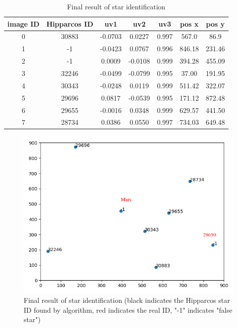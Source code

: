\documentclass[12pt,a4paper,twoside]{article}
\begin{document}
\renewcommand{\arraystretch}{1.5}
\begin{table}[!htbp]
\centering
\begin{tabular}{|c|c|c|c|c|c|c|}
\hline 
image ID & Hipparcos ID & uv1 & uv2 & uv3 & pos x & pos y \\ 
\hline 
0 &  30883 & -0.0703 &  0.0227 & 0.997 &  567.0 &  86.9 \\
\hline 
1 & -1 & -0.0423 &  0.0767 & 0.996 &  846.18 &  231.46 \\
\hline 
2 & -1 &  0.0009 & -0.0108 & 0.999 &  394.28 &  455.09 \\
\hline 
3 &  32246 & -0.0499 & -0.0799 & 0.995 &  37.00 &  191.95 \\
\hline 
4 &  30343 & -0.0248 &  0.0119 & 0.999 &  511.42 &  322.07 \\
\hline 
5 &  29696 &  0.0817 & -0.0539 & 0.995 &  171.12 &  872.48 \\
\hline 
6 &  29655 & -0.0016 &  0.0348 & 0.999 &  629.57 &  441.50 \\
\hline 
7 &  28734 & 0.0386 & 0.0550 & 0.997 & 734.03 & 649.48 \\
\hline 
\end{tabular}
\caption{Final result of star identification}
\label{tab:example_5}
\end{table}


\begin{figure}[!htbp]
\includegraphics[scale=0.6]{example_2.png}
\centering
\caption[Final result of star identification]{Final result of star identification (black indicates the Hipparcos star ID found by algorithm, red indicates the real ID, "-1" indicates "false star")}
\label{fig:example_5}
\end{figure}
\end{document}

